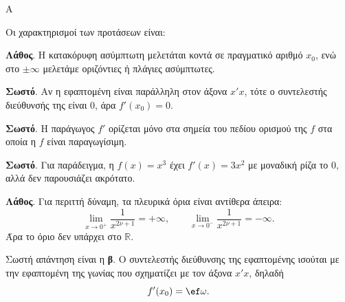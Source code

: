 \begin{thema}{Α}
\begin{erwthma}
\item {}

\item {}

\item {}

\item Οι χαρακτηρισμοί των προτάσεων είναι:
\begin{alist}
\item \textbf{Λάθος}. Η κατακόρυφη ασύμπτωτη μελετάται κοντά σε πραγματικό αριθμό $x_0$, ενώ στο $\pm\infty$ μελετάμε οριζόντιες ή πλάγιες ασύμπτωτες.
\item \textbf{Σωστό}. Αν η εφαπτομένη είναι παράλληλη στον άξονα $x'x$, τότε ο συντελεστής διεύθυνσής της είναι $0$, άρα $f'(x_0)=0$.
\item \textbf{Σωστό}. Η παράγωγος $f'$ ορίζεται μόνο στα σημεία του πεδίου ορισμού της $f$ στα οποία η $f$ είναι παραγωγίσιμη.
\item \textbf{Σωστό}. Για παράδειγμα, η $f(x)=x^3$ έχει $f'(x)=3x^2$ με μοναδική ρίζα το $0$, αλλά δεν παρουσιάζει ακρότατο.
\item \textbf{Λάθος}. Για περιττή δύναμη, τα πλευρικά όρια είναι αντίθερα άπειρα:
\[ \lim_{x\to0^+}\dfrac{1}{x^{2\nu+1}}=+\infty,\qquad
\lim_{x\to0^-}\dfrac{1}{x^{2\nu+1}}=-\infty. \]
Άρα το όριο δεν υπάρχει στο $\mathbb{R}$.
\end{alist}

\item Σωστή απάντηση είναι η \textbf{β}. Ο συντελεστής διεύθυνσης της εφαπτομένης ισούται με την εφαπτομένη της γωνίας που σχηματίζει με τον άξονα $x'x$, δηλαδή
\[ f'(x_0)=\ef\omega. \]
\end{erwthma}
\end{thema}

